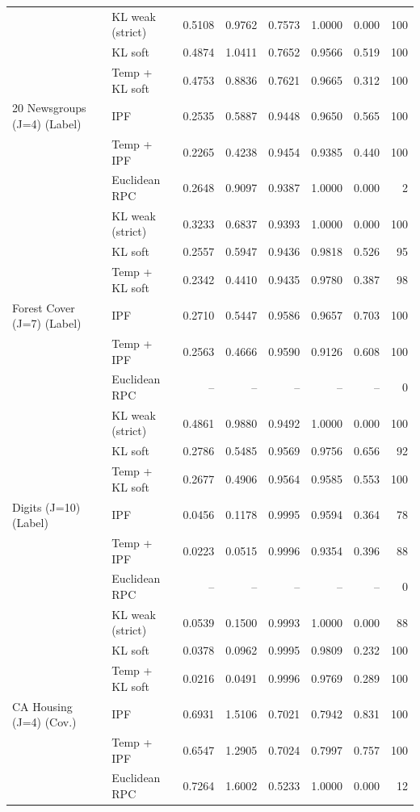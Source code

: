 \begin{longtable}{llrrrrrr}
 & KL weak (strict) & 0.5108 & 0.9762 & 0.7573 & 1.0000 & 0.000 & 100 \\
 & KL soft & 0.4874 & 1.0411 & 0.7652 & 0.9566 & 0.519 & 100 \\
 & Temp + KL soft & 0.4753 & 0.8836 & 0.7621 & 0.9665 & 0.312 & 100 \\
20 Newsgroups (J=4) (Label) & IPF & 0.2535 & 0.5887 & 0.9448 & 0.9650 & 0.565 & 100 \\
 & Temp + IPF & 0.2265 & 0.4238 & 0.9454 & 0.9385 & 0.440 & 100 \\
 & Euclidean RPC & 0.2648 & 0.9097 & 0.9387 & 1.0000 & 0.000 & 2 \\
 & KL weak (strict) & 0.3233 & 0.6837 & 0.9393 & 1.0000 & 0.000 & 100 \\
 & KL soft & 0.2557 & 0.5947 & 0.9436 & 0.9818 & 0.526 & 95 \\
 & Temp + KL soft & 0.2342 & 0.4410 & 0.9435 & 0.9780 & 0.387 & 98 \\
Forest Cover (J=7) (Label) & IPF & 0.2710 & 0.5447 & 0.9586 & 0.9657 & 0.703 & 100 \\
 & Temp + IPF & 0.2563 & 0.4666 & 0.9590 & 0.9126 & 0.608 & 100 \\
 & Euclidean RPC & -- & -- & -- & -- & -- & 0 \\
 & KL weak (strict) & 0.4861 & 0.9880 & 0.9492 & 1.0000 & 0.000 & 100 \\
 & KL soft & 0.2786 & 0.5485 & 0.9569 & 0.9756 & 0.656 & 92 \\
 & Temp + KL soft & 0.2677 & 0.4906 & 0.9564 & 0.9585 & 0.553 & 100 \\
Digits (J=10) (Label) & IPF & 0.0456 & 0.1178 & 0.9995 & 0.9594 & 0.364 & 78 \\
 & Temp + IPF & 0.0223 & 0.0515 & 0.9996 & 0.9354 & 0.396 & 88 \\
 & Euclidean RPC & -- & -- & -- & -- & -- & 0 \\
 & KL weak (strict) & 0.0539 & 0.1500 & 0.9993 & 1.0000 & 0.000 & 88 \\
 & KL soft & 0.0378 & 0.0962 & 0.9995 & 0.9809 & 0.232 & 100 \\
 & Temp + KL soft & 0.0216 & 0.0491 & 0.9996 & 0.9769 & 0.289 & 100 \\
CA Housing (J=4) (Cov.) & IPF & 0.6931 & 1.5106 & 0.7021 & 0.7942 & 0.831 & 100 \\
 & Temp + IPF & 0.6547 & 1.2905 & 0.7024 & 0.7997 & 0.757 & 100 \\
 & Euclidean RPC & 0.7264 & 1.6002 & 0.5233 & 1.0000 & 0.000 & 12 \\

\end{longtable}

